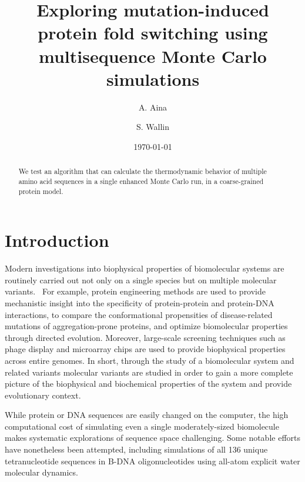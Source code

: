 \documentclass[%
 aip,
rsi,%
 amsmath,amssymb,
 reprint,%
]{revtex4-1}
\begin{document}

\title[Multisequence Monte Carlo simulations]{Exploring mutation-induced protein fold switching using multisequence Monte Carlo simulations}

\author{A. Aina}
\author{S. Wallin}

\date{\today}

\begin{abstract}
We test an algorithm that can calculate the thermodynamic behavior of multiple amino acid  sequences in a single enhanced Monte Carlo run, in a coarse-grained protein model. 
\end{abstract}

                             


\maketitle

\section{Introduction}
\noindent
Modern investigations into biophysical properties of biomolecular systems are routinely carried out not only on a single species but on multiple molecular variants.~\cite{Vukmirovic2000,Nickson2010} For example, protein engineering methods are used to provide mechanistic insight into the specificity of protein-protein and protein-DNA interactions, to compare the  conformational propensities of disease-related mutations of aggregation-prone proteins, and optimize biomolecular properties through directed evolution. Moreover, large-scale screening techniques such as phage display and microarray chips are used to provide biophysical properties across entire genomes. In short, through the study of a biomolecular system and related variants molecular variants are studied in order to gain a more complete picture of the biophysical and biochemical properties of the system and provide evolutionary context. 

While protein or DNA sequences are easily changed on the computer, the high computational cost of simulating even a single moderately-sized biomolecule makes systematic explorations of sequence space challenging. Some notable efforts have nonetheless been attempted, including simulations of all 136 unique tetranucleotide sequences in B-DNA oligonucleotides using all-atom explicit water molecular dynamics.~\cite{Beveridge2004}
\end{document}

